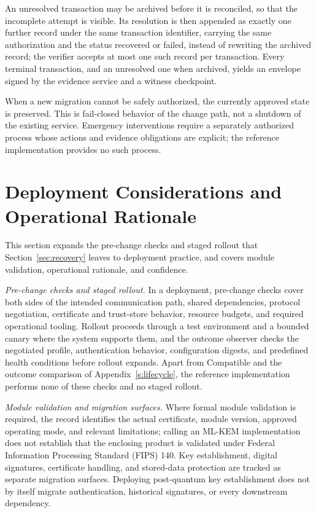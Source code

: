 \documentclass[journal]{IEEEtran}
\newcommand{\Compatible}{\mathrm{Compatible}}
\begin{document}
An unresolved transaction may be archived before it is reconciled, so that the incomplete attempt is visible. Its resolution is then appended as exactly one further record under the same transaction identifier, carrying the same authorization and the status recovered or failed, instead of rewriting the archived record; the verifier accepts at most one such record per transaction. Every terminal transaction, and an unresolved one when archived, yields an envelope signed by the evidence service and a witness checkpoint.

When a new migration cannot be safely authorized, the currently approved state is preserved. This is fail-closed behavior of the change path, not a shutdown of the existing service. Emergency interventions require a separately authorized process whose actions and evidence obligations are explicit; the reference implementation provides no such process.

\section{Deployment Considerations and Operational Rationale}
\label{s:rationale}
This section expands the pre-change checks and staged rollout that Section~\ref{sec:recovery} leaves to deployment practice, and covers module validation, operational rationale, and confidence.

\emph{Pre-change checks and staged rollout.} In a deployment, pre-change checks cover both sides of the intended communication path, shared dependencies, protocol negotiation, certificate and trust-store behavior, resource budgets, and required operational tooling. Rollout proceeds through a test environment and a bounded canary where the system supports them, and the outcome observer checks the negotiated profile, authentication behavior, configuration digests, and predefined health conditions before rollout expands. Apart from $\Compatible$ and the outcome comparison of Appendix~\ref{s:lifecycle}, the reference implementation performs none of these checks and no staged rollout.

\emph{Module validation and migration surfaces.} Where formal module validation is required, the record identifies the actual certificate, module version, approved operating mode, and relevant limitations; calling an ML-KEM implementation does not establish that the enclosing product is validated under Federal Information Processing Standard (FIPS) 140. Key establishment, digital signatures, certificate handling, and stored-data protection are tracked as separate migration surfaces. Deploying post-quantum key establishment does not by itself migrate authentication, historical signatures, or every downstream dependency.
\end{document}
